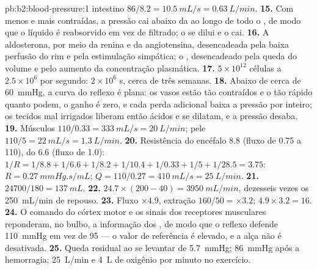 \begin{solution}{pb:b2:blood-pressure:1}
intestino $86/8.2 = \qty{10.5}{mL/s} = \qty{0.63}{L/min}$.
\textbf{15.} Com menos  e  mais contraídas, a pressão
 cai abaixo da  ao longo de todo o , de
modo que o líquido é reabsorvido em vez de filtrado; o  se dilui e
o  cai.
\textbf{16.} A aldosterona, por meio da renina e da angiotensina,
desencadeada pela baixa perfusão do rim e pela estimulação simpática; o
, desencadeado pela queda do volume e pelo aumento
da concentração plasmática.
\textbf{17.} $5\times 10^{12}$ células a $2.5\times 10^{6}$ por segundo:
$2\times 10^{6}$ s, cerca de três semanas.
\textbf{18.} Abaixo de cerca de \qty{60}{mmHg}, a curva do reflexo é
plana: os vasos estão tão contraídos e o  tão rápido quanto
podem, o ganho é zero, e cada perda adicional baixa a pressão por
inteiro; os tecidos mal irrigados liberam então ácidos e se dilatam, e
a pressão desaba.
\textbf{19.} Músculos $110/0.33 = \qty{333}{mL/s} = \qty{20}{L/min}$;
pele $110/5 = \qty{22}{mL/s} = \qty{1.3}{L/min}$.
\textbf{20.} Resistência do encéfalo $8.8$ (fluxo de 0.75 a 110), do
 $6.6$ (fluxo de 1.0):
$1/R = 1/8.8 + 1/6.6 + 1/8.2 + 1/10.4 + 1/0.33 + 1/5 +
1/28.5 = 3.75$: $R = \qty{0.27}{mmHg.s/mL}$; $Q = 110/0.27 =
\qty{410}{mL/s} = \qty{25}{L/min}$.
\textbf{21.} $\num{24700}/180 = \qty{137}{mL}$.
\textbf{22.} $24.7\times(200 - 40) = \qty{3950}{mL/min}$, dezesseis
vezes os \qty{250}{mL/min} de repouso.
\textbf{23.} Fluxo $\times 4.9$, extração $160/50 = \times 3.2$;
$4.9\times 3.2 = 16$.
\textbf{24.} O comando do córtex motor e os sinais dos receptores
musculares reponderam, no bulbo, a informação dos , de
modo que o reflexo defende \qty{110}{mmHg} em vez de 95 --- o valor de
referência é elevado, e a alça não é desativada.
\textbf{25.} Queda residual ao se levantar de \qty{5.7}{mmHg};
\qty{86}{mmHg} após a hemorragia; \qty{25}{L/min} e \qty{4}{L} de
oxigênio por minuto no exercício.
\end{solution}

